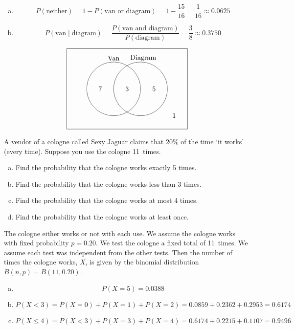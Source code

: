\documentclass[12pt,letterpaper]{exam}
\begin{document}
\begin{questions}
\begin{enumerate}[(a)]
\item 
	\[
	P(\text{neither})= 1 - P(\text{van or diagram})= 1 - \dfrac{15}{16}= \dfrac{1}{16} \approx 0.0625
	\] \pspace

\item 
	\[
	P(\text{van} \;|\; \text{diagram})= \dfrac{P(\text{van and diagram})}{P(\text{diagram})}= \dfrac{3}{8} \approx 0.3750
	\]
\end{enumerate} \pspace \vfill

	\[
	\begin{tikzpicture}[scale=0.69]
	\draw (0,0) rectangle (9,6);
	\draw (3.5,3) circle (2);
	\draw (5.5,3) circle (2);
	
	\node at (3.5,5.3) {Van};
	\node at (5.7,5.3) {Diagram}; 
	
	\node at (2.5,3) {7};
	\node at (4.5,3) {3};
	\node at (6.5,3) {5};
	\node at (8,1) {1};
	\end{tikzpicture}
	\]



\newpage
\question[15] A vendor of a cologne called Sexy Jaguar claims that 20\% of the time `it works' (every time). Suppose you use the cologne 11~times. 
	\begin{enumerate}[(a)]
	\item Find the probability that the cologne works exactly 5 times. 
	\item Find the probability that the cologne works less than 3 times.
	\item Find the probability that the cologne works at most 4 times.
	\item Find the probability that the cologne works at least once. 
	\end{enumerate} \pspace

\sol The cologne either works or not with each use. We assume the cologne works with fixed probability $p= 0.20$. We test the cologne a fixed total of 11~times. We assume each test was independent from the other tests. Then the number of times the cologne works, $X$, is given by the binomial distribution $B(n, p)= B(11, 0.20)$. \pspace

\begin{enumerate}[(a)]
\item 
	\[
	P(X= 5)= 0.0388
	\] \pspace

\item 
	\[
	P(X < 3)= P(X= 0) + P(X= 1) + P(X= 2)= 0.0859 + 0.2362 + 0.2953= 0.6174
	\] \pspace

\item 
	\[
	P(X \leq 4)= P(X < 3) + P(X= 3) + P(X= 4)= 0.6174 + 0.2215 + 0.1107= 0.9496
	\] \pspace


\end{enumerate}
\end{questions}
\end{document}
